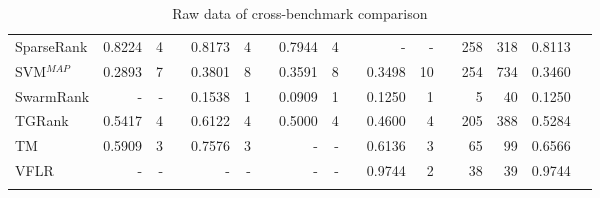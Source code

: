 \documentclass{sig-alternate}
\begin{document}
\begin{longtable}[!hp]{@{}lrrrrrrrrrrrrrrrr@{}}
SparseRank & 0.8224 & 4 && 0.8173 & 4 && 0.7944 & 4 && - & - && 258 & 318 & 0.8113 \\
SVM$^{MAP}$ & 0.2893 & 7 && 0.3801 & 8 && 0.3591 & 8 && 0.3498 & 10 && 254 & 734 & 0.3460 \\
SwarmRank & - & - && 0.1538 & 1 && 0.0909 & 1 && 0.1250 & 1 && 5 & 40 & 0.1250 \\
TGRank & 0.5417 & 4 && 0.6122 & 4 && 0.5000 & 4 && 0.4600 & 4 && 205 & 388 & 0.5284 \\
TM & 0.5909 & 3 && 0.7576 & 3 && - & - && 0.6136 & 3 && 65 & 99 & 0.6566 \\
VFLR & - & - && - & - && - & - && 0.9744 & 2 && 38 & 39 & 0.9744 \\
\bottomrule
\caption{Raw data of cross-benchmark comparison}
\label{tab:raw_data}
\end{longtable}
\end{document}
